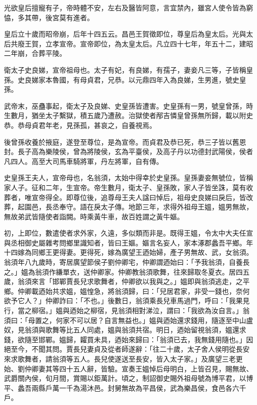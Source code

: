 \begin{pinyinscope}
光欲皇后擅寵有子，帝時體不安，左右及醫皆阿意，言宜禁內，雖宮人使令皆為窮恊，多其帶，後宮莫有進者。

皇后立十歲而昭帝崩，后年十四五云。昌邑王賀徵即位，尊皇后為皇太后。光與太后共廢王賀，立孝宣帝。宣帝即位，為太皇太后。凡立四十七年，年五十二，建昭二年崩，合葬平陵。

衛太子史良娣，宣帝祖母也。太子有妃，有良娣，有孺子，妻妾凡三等，子皆稱皇孫。史良娣家本魯國，有母貞君，兄恭。以元鼎四年入為良娣，生男進，號史皇孫。

武帝末，巫蠱事起，衛太子及良娣、史皇孫皆遭害。史皇孫有一男，號皇曾孫，時生數月，猶坐太子繫獄，積五歲乃遭赦。治獄使者邴吉憐皇曾孫無所歸，載以附史恭。恭母貞君年老，見孫孤，甚哀之，自養視焉。

後曾孫收養於掖庭，遂登至尊位，是為宣帝。而貞君及恭已死，恭三子皆以舊恩封。長子高為樂陵侯，曾為將陵侯，玄為平臺侯，及高子丹以功德封武陽侯，侯者凡四人。高至大司馬車騎將軍，丹左將軍，自有傳。

史皇孫王夫人，宣帝母也，名翁須，太始中得幸於史皇孫。皇孫妻妾無號位，皆稱家人子。征和二年，生宣帝。帝生數月，衛太子、皇孫敗，家人子皆坐誅，莫有收葬者，唯宣帝得全。即尊位後，追尊母王夫人諡曰悼后，祖母史良娣曰戾后，皆改葬，起園邑，長丞奉守。語在戾太子傳。地節三年，求得外祖母王媼，媼男無故，無故弟武皆隨使者詣闕。時乘黃牛車，故百姓謂之黃牛嫗。

初，上即位，數遣使者求外家，久遠，多似類而非是。既得王媼，令太中大夫任宣與丞相御史屬雜考問鄉里識知者，皆曰王嫗。嫗言名妄人，家本涿郡蠡吾平鄉。年十四嫁為同鄉王更得妻。更得死，嫁為廣望王迺始婦，產子男無故、武，女翁須。翁須年八九歲時，寄居廣望節侯子劉仲卿宅，仲卿謂迺始曰：「予我翁須，自養長之。」媼為翁須作縑單衣，送仲卿家。仲卿教翁須歌舞，往來歸取冬夏衣。居四五歲，翁須來言「邯鄲賈長兒求歌舞者，仲卿欲以我與之。」媼即與翁須逃走，之平鄉。仲卿載迺始共求媼，媼惶急，將翁須歸，曰：「兒居君家，非受一錢也，奈何欲予它人？」仲卿詐曰：「不也。」後數日，翁須乘長兒車馬過門，呼曰：「我果見行，當之柳宿。」媼與迺始之柳宿，見翁須相對涕泣，謂曰：「我欲為汝自言。」翁須曰：「母置之，何家不可以居？自言無益也。」媼與迺始還求錢用，隨逐至中山盧奴，見翁須與歌舞等比五人同處，媼與翁須共宿。明日，迺始留視翁須，媼還求錢，欲隨至邯鄲。媼歸，糶買未具，迺始來歸曰：「翁須已去，我無錢用隨也。」因絕至今，不聞其問。賈長兒妻貞及從者師遂辭：「往二十歲，太子舍人侯明從長安來求歌舞者，請翁須等五人。長兒使遂送至長安，皆入太子家。」及廣望三老更始、劉仲卿妻其等四十五人辭，皆驗。宣奏王媼悼后母明白，上皆召見，賜無故、武爵關內侯，旬月間，賞賜以鉅萬計。頃之，制詔御史賜外祖母號為博平君，以博平、蠡吾兩縣戶萬一千為湯沐邑。封舅無故為平昌侯，武為樂昌侯，食邑各六千戶。


\end{pinyinscope}
